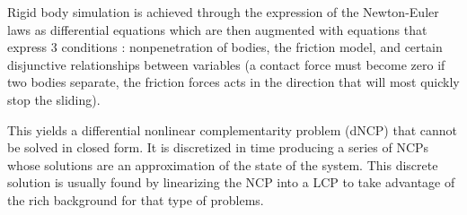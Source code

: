 Rigid body simulation is achieved through the expression of the Newton-Euler laws as differential equations which are then augmented with equations that express 3 conditions : nonpenetration of bodies, the friction model, and certain disjunctive relationships between variables (a contact force must become zero if two bodies separate, the friction forces acts in the direction that will most quickly stop the sliding).

This yields a differential nonlinear complementarity problem (dNCP) that cannot be solved in closed form. It is discretized in time producing a series of NCPs whose solutions are an approximation of the state of the system.  This discrete solution is usually found by linearizing the NCP into a LCP to take advantage of the rich background for that type of problems.

